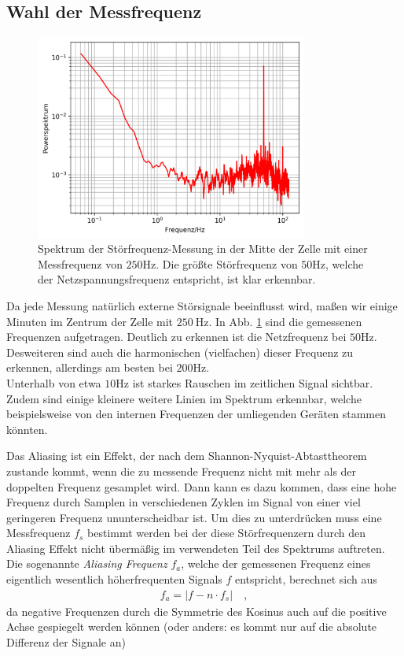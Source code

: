 \documentclass[12pt,a4paper,titlepage,headinclude]{scrartcl}
\numberwithin{equation}{subsection}
\begin{document}
\subsection{Wahl der Messfrequenz}

\begin{figure}[!ht]
\centering
\includegraphics[width=0.8\textwidth]{stoer.png}
\caption{Spektrum der Störfrequenz-Messung in der Mitte der Zelle mit einer Messfrequenz von $250\si{\hertz}$. Die größte Störfrequenz von $50\si{\hertz}$, welche der Netzspannungsfrequenz entspricht, ist klar erkennbar.}
\label{fig:stoer}
\end{figure}

Da jede Messung natürlich externe Störsignale beeinflusst wird, maßen wir einige Minuten im Zentrum der Zelle mit $\SI{250}\hertz$.
In Abb. \ref{fig:stoer} sind die gemessenen Frequenzen aufgetragen.
Deutlich zu erkennen ist die Netzfrequenz bei $50\si{\hertz}$.
Desweiteren sind auch die harmonischen (vielfachen) dieser Frequenz zu erkennen, allerdings am besten bei $200\si{\hertz}$.\\
Unterhalb von etwa $10\si{\hertz}$ ist starkes Rauschen im zeitlichen Signal sichtbar.
Zudem sind einige kleinere weitere Linien im Spektrum erkennbar, welche beispielsweise von den internen Frequenzen der umliegenden Geräten stammen könnten.

Das Aliasing ist ein Effekt, der nach dem Shannon-Nyquist-Abtasttheorem zustande kommt, wenn die zu messende Frequenz nicht mit mehr als der doppelten Frequenz gesamplet wird.
Dann kann es dazu kommen, dass eine hohe Frequenz durch Samplen in verschiedenen Zyklen im Signal von einer viel geringeren Frequenz ununterscheidbar ist.
Um dies zu unterdrücken muss eine Messfrequenz $f_s$ bestimmt werden bei der diese Störfrequenzern durch den Aliasing Effekt nicht übermäßig im verwendeten Teil des Spektrums auftreten.
Die sogenannte \textit{Aliasing Frequenz} $f_a$, welche der gemessenen Frequenz eines eigentlich wesentlich höherfrequenten Signals $f$ entspricht, berechnet sich aus
\begin{align}
  f_a=|f-n\cdot f_s|\quad,
  \label{eq:stoerfreq}
\end{align}
da negative Frequenzen durch die Symmetrie des Kosinus auch auf die positive Achse gespiegelt werden können (oder anders: es kommt nur auf die absolute Differenz der Signale an)
\end{document}
